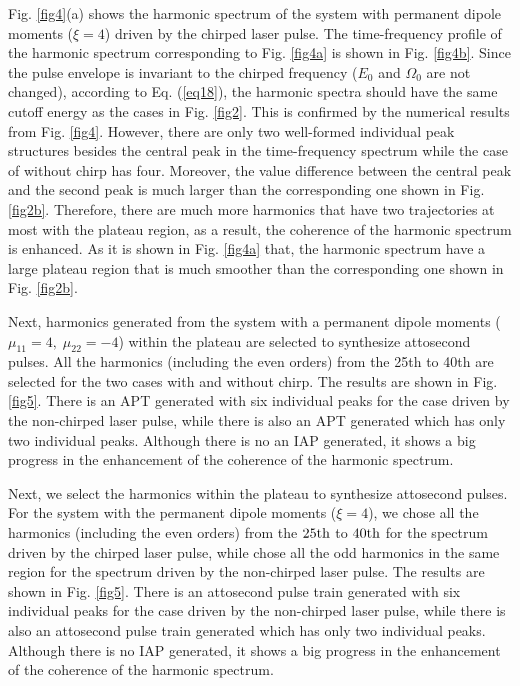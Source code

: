 \documentclass[10pt,letterpaper]{article}
\begin{document}
Fig. \ref{fig4}(a) shows the harmonic spectrum of the system with permanent dipole moments ($ \xi=4 $) driven by the chirped laser pulse. The time-frequency profile of the harmonic spectrum corresponding to Fig. \ref{fig4a} is shown in Fig. \ref{fig4b}. Since the pulse envelope is invariant to the chirped frequency ($ E_{0} $ and $ \Omega_{0} $ are not changed), according to Eq. (\ref{eq18}), the harmonic spectra should have the same cutoff energy as the cases in Fig. \ref{fig2}. This is confirmed by the numerical results from Fig. \ref{fig4}. However, there are only two well-formed individual peak structures besides the central peak in the time-frequency spectrum while the case of without chirp has four. Moreover, the value difference between the central peak and the second peak is much larger than the corresponding one shown in Fig. \ref{fig2b}. Therefore, there are much more harmonics that have two trajectories at most with the plateau region, as a result, the coherence of the harmonic spectrum is enhanced. As it is shown in Fig. \ref{fig4a} that, the harmonic spectrum have a large plateau region that is much smoother than the corresponding one shown in Fig. \ref{fig2b}.

Next, harmonics generated from the system with a permanent dipole moments ($\mu_{11}=4,\;\mu_{22}=-4$) within the plateau are selected to synthesize attosecond pulses. All the harmonics (including the even orders) from the 25th to 40th are selected for the two cases with and without chirp. The results are shown in Fig. \ref{fig5}. There is an APT generated with six individual peaks for the case driven by the non-chirped laser pulse, while there is also an APT generated which has only two individual peaks. Although there is no an IAP generated, it shows a big progress in the enhancement of the coherence of the harmonic spectrum.

Next, we select the harmonics within the plateau to synthesize attosecond pulses. For the system with the permanent dipole moments ($ \xi=4 $), we chose all the harmonics (including the even orders) from the $ 25\rm{th} $ to $ 40\rm{th} $ for the spectrum driven by the chirped laser pulse, while chose all the odd harmonics in the same region for the spectrum driven by the non-chirped laser pulse. The results are shown in Fig. \ref{fig5}. There is an attosecond pulse train generated with six individual peaks for the case driven by the non-chirped laser pulse, while there is also an attosecond pulse train generated which has only two individual peaks. Although there is no IAP generated, it shows a big progress in the enhancement of the coherence of the harmonic spectrum.
\end{document}
